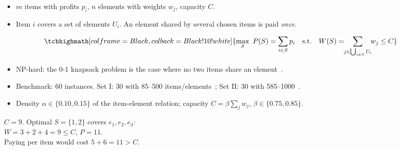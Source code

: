 \documentclass[12pt,preprintnumbers,amsmath,amssymb,nofootinbib,superscriptaddress]{revtex4-1}
\begin{document}
\begin{minipage}[t]{0.56\textwidth}\vspace{0pt}
\small
\begin{itemize}
  \item $m$ items with profits $p_i$, $n$ elements with weights $w_j$, capacity $C$.
  \item Item $i$ covers a set of elements $U_i$. An element shared by several chosen items is paid \emph{once}.
\end{itemize}
\begin{equation*}
\tcbhighmath[colframe=Black,colback=Black!10!white]{
\max_{S}\ P(S)=\sum_{i\in S}p_i
\quad\text{s.t.}\quad
W(S)=\!\!\sum_{j\in\bigcup_{i\in S}U_i}\!\! w_j\le C}
\end{equation*}
\begin{itemize}
  \item NP-hard: the 0-1 knapsack problem is the case where no two items share an element~\cite{Goldschmidt1994,Arulselvan2014}.
  \item Benchmark: 60 instances. Set I: 30 with 85--500 items/elements~\cite{He2018}; Set II: 30 with 585--1000~\cite{Wei2021}.
  \item Density $\alpha\in\{0.10,0.15\}$ of the item-element relation; capacity $C=\beta\sum_j w_j$, $\beta\in\{0.75,0.85\}$.
\end{itemize}
\end{minipage}\hfill
\begin{minipage}[t]{0.40\textwidth}\vspace{0pt}
\centering
\vspace{0.4cm}

\vspace{0.2cm}
\footnotesize
$C=9$. Optimal $S=\{1,2\}$ covers $e_1,e_2,e_3$:\\
$W=3+2+4=9\le C$, $P=11$.\\
Paying per item would cost $5+6=11>C$.
\end{minipage}
\end{document}
